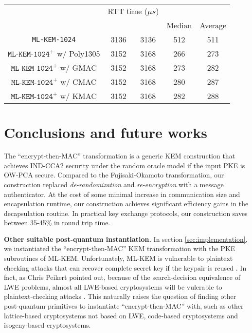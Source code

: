 \documentclass[journal=tches,submission]{iacrtrans}
\newcommand{\us}{\mu s}
\begin{document}
\begin{table}[H]
\begin{tabular}{|c|c|c|c|c|}
        & \multicolumn{2}{|c|}{RTT time ($\us$)} \\
        \cline{4-5}
        & & & Median & Average \\
        \hline
        \texttt{ML-KEM-1024} & 3136 & 3136 & 512 & 511 \\
        \hline
        $\texttt{ML-KEM-1024}^+$ w/ Poly1305 & 3152 & 3168 & 266 & 273 \\
        \hline
        $\texttt{ML-KEM-1024}^+$ w/ GMAC & 3152 & 3168 & 273 & 282 \\
        \hline
        $\texttt{ML-KEM-1024}^+$ w/ CMAC & 3152 & 3168 & 280 & 287 \\
        \hline
        $\texttt{ML-KEM-1024}^+$ w/ KMAC & 3152 & 3168 & 282 & 288 \\
        \hline
    \end{tabular}
\end{table}

\section{Conclusions and future works}\label{sec:future-works}
The ``encrypt-then-MAC'' transformation is a generic KEM construction that achieves IND-CCA2 security under the random oracle model if the input PKE is OW-PCA secure. Compared to the Fujisaki-Okamoto transformation, our construction replaced \emph{de-randomization} and \emph{re-encryption} with a message authenticator. At the cost of some minimal increase in communication size and encapsulation runtime, our construction achieves significant efficiency gains in the decapsulation routine. In practical key exchange protocols, our construction saves between 35-45\% in round trip time.

\textbf{Other suitable post-quantum instantiation.} In section \ref{sec:implementation}, we instantiated the ``encrypt-then-MAC'' KEM transformation with the PKE subroutines of ML-KEM. Unfortunately, ML-KEM is vulnerable to plaintext checking attacks that can recover complete secret key if the keypair is reused \cite{DBLP:conf/eurocrypt/BaetuDHTV19}. In fact, as Chris Peikert pointed out, because of the search-decision equivalence of LWE problems, almost all LWE-based cryptosystems will be vulerable to plaintext-checking attacks \cite{DBLP:conf/pqcrypto/Peikert14}. This naturally raises the question of finding other post-quantum primitives to instantiate ``encrypt-then-MAC'' with, such as other lattice-based cryptosystems not based on LWE, code-based cryptosystems and isogeny-based cryptosystems.
\end{document}
